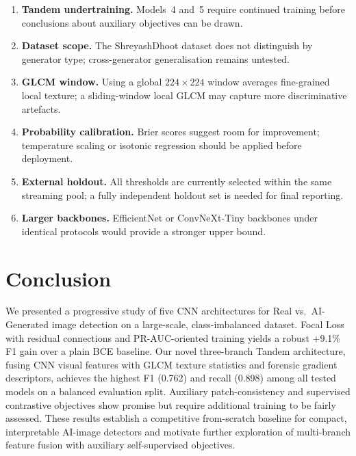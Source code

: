 \documentclass[10pt,twocolumn]{article}
\begin{document}
\begin{enumerate}[leftmargin=*, noitemsep]
  \item \textbf{Tandem undertraining.}
        Models~4 and~5 require continued training before conclusions
        about auxiliary objectives can be drawn.
  \item \textbf{Dataset scope.}
        The ShreyashDhoot dataset does not distinguish by generator
        type; cross-generator generalisation remains untested.
  \item \textbf{GLCM window.}
        Using a global $224\times224$ window averages fine-grained local
        texture; a sliding-window local GLCM may capture more
        discriminative artefacts.
  \item \textbf{Probability calibration.}
        Brier scores suggest room for improvement; temperature scaling
        or isotonic regression should be applied before deployment.
  \item \textbf{External holdout.}
        All thresholds are currently selected within the same streaming
        pool; a fully independent holdout set is needed for final
        reporting.
  \item \textbf{Larger backbones.}
        EfficientNet or ConvNeXt-Tiny backbones under identical
        protocols would provide a stronger upper bound.
\end{enumerate}

\section{Conclusion}
\label{sec:conclusion}

We presented a progressive study of five CNN architectures for
Real vs.\ AI-Generated image detection on a large-scale,
class-imbalanced dataset.
Focal Loss with residual connections and PR-AUC-oriented training
yields a robust +9.1\% F1 gain over a plain BCE baseline.
Our novel three-branch Tandem architecture, fusing CNN visual
features with GLCM texture statistics and forensic gradient
descriptors, achieves the highest F1 (0.762) and recall (0.898)
among all tested models on a balanced evaluation split.
Auxiliary patch-consistency and supervised contrastive objectives show
promise but require additional training to be fairly assessed.
These results establish a competitive from-scratch baseline for
compact, interpretable AI-image detectors and motivate further
exploration of multi-branch feature fusion with auxiliary
self-supervised objectives.
\end{document}

